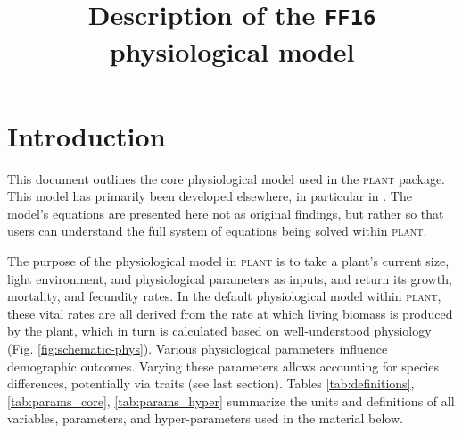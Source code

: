 \documentclass[10pt,twoside]{article}
\title{Description of the \texttt{FF16} physiological model}
\date{}
\newcommand{\plant}{\textsc{plant}}
\begin{document}
\maketitle

\tableofcontents

\section{Introduction}

This document outlines the core physiological model used in the {\plant}
package. This model has primarily been developed elsewhere, in particular in
\citet{Falster-2011}. The model's equations are presented here not as original findings,
but rather so that users can understand the full system of equations being
solved within {\plant}.

The purpose of the physiological model in {\plant} is to take a plant's
current size, light environment, and physiological parameters as inputs,
and return its growth, mortality, and fecundity rates. In the default
physiological model within {\plant}, these vital rates are all
derived from the rate at which living biomass is produced by the plant,
which in turn is calculated based on well-understood physiology (Fig.
\ref{fig:schematic-phys}). Various physiological parameters
influence demographic outcomes. Varying these parameters allows accounting for
species differences, potentially via traits (see last
section). Tables
\ref{tab:definitions}, \ref{tab:params_core}, \ref{tab:params_hyper} summarize the
units and definitions of all variables, parameters, and hyper-parameters used in
the material below.
\end{document}
